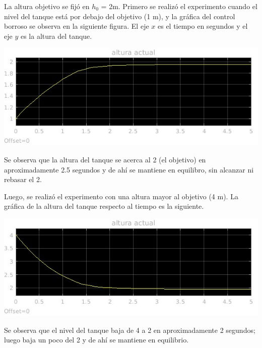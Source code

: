 \documentclass{article}
\begin{document}
La altura objetivo se fijó en $h_0$ = 2m. Primero se realizó el experimento cuando el nivel del tanque está por debajo del objetivo (1 m), y la gráfica del control borroso se observa en la siguiente figura. El eje $x$ es el tiempo en segundos y el eje $y$ es la altura del tanque.

\begin{center}
\includegraphics[width=\linewidth]{altura1}
\end{center}

Se observa que la altura del tanque se acerca al 2 (el objetivo) en aproximadamente 2.5 segundos y de ahí se mantiene en equilibro, sin alcanzar ni rebasar el 2.

Luego, se realizó el experimento con una altura mayor al objetivo (4 m). La gráfica de la altura del tanque respecto al tiempo es la siguiente.

\begin{center}
\includegraphics[width=\linewidth]{altura4}
\end{center}

Se observa que el nivel del tanque baja de 4 a 2 en aproximadamente 2 segundos; luego baja un poco del 2 y de ahí se mantiene en equilibrio.
\end{document}
